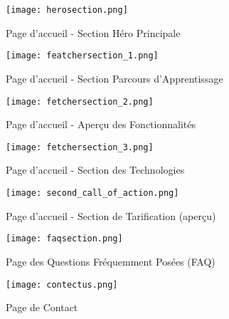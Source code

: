 \documentclass[12pt, a4paper]{article}
\begin{document}
\begin{figure}[h!]
  \centering
  \texttt{[image: herosection.png]} 
  \caption{Page d'accueil - Section Héro Principale}
  \label{fig:home_hero_accelerate}
\end{figure}

\begin{figure}[h!]
  \centering
  \texttt{[image: featchersection\_1.png]} 
  \caption{Page d'accueil - Section Parcours d'Apprentissage}
  \label{fig:learning_journey}
\end{figure}

\begin{figure}[h!]
  \centering
  \texttt{[image: fetchersection\_2.png]} 
  \caption{Page d'accueil - Aperçu des Fonctionnalités}
  \label{fig:features_overview_grid}
\end{figure}

\begin{figure}[h!]
  \centering
  \texttt{[image: fetchersection\_3.png]} 
  \caption{Page d'accueil - Section des Technologies}
  \label{fig:technologies}
\end{figure}

\begin{figure}[h!]
  \centering
  \texttt{[image: second\_call\_of\_action.png]} 
  \caption{Page d'accueil - Section de Tarification (aperçu)}
  \label{fig:pricing_section}
\end{figure}

\begin{figure}[h!]
  \centering
  \texttt{[image: faqsection.png]} 
  \caption{Page des Questions Fréquemment Posées (FAQ)}
  \label{fig:faq_page}
\end{figure}

\begin{figure}[h!]
  \centering
  \texttt{[image: contectus.png]} 
  \caption{Page de Contact}
  \label{fig:contact_page}
\end{figure}
\end{document}
